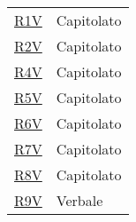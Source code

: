 \begin{center}
\begin{longtable}[!h]{p{50px} p{50px}}
        \hyperref[tab:RequisitiVincolo]{R1V}       & Capitolato                                     \\
        \hyperref[tab:RequisitiVincolo]{R2V}       & Capitolato                                     \\
        \hyperref[tab:RequisitiVincolo]{R4V}       & Capitolato                                     \\
        \hyperref[tab:RequisitiVincolo]{R5V}       & Capitolato                                     \\
        \hyperref[tab:RequisitiVincolo]{R6V}       & Capitolato                                     \\
        \hyperref[tab:RequisitiVincolo]{R7V}       & Capitolato                                     \\
        \hyperref[tab:RequisitiVincolo]{R8V}       & Capitolato                                     \\
        \hyperref[tab:RequisitiVincolo]{R9V}       & Verbale                                        \\
    \end{longtable}
\end{center}